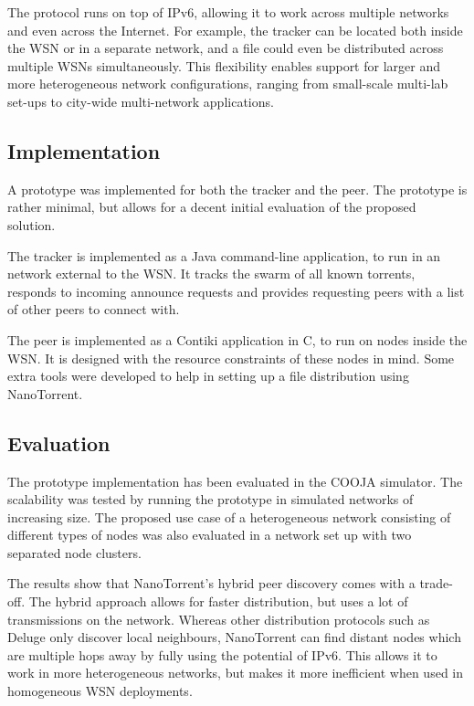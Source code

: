 The protocol runs on top of \gls{IPv6}, allowing it to work across multiple networks and even across the Internet. For example, the tracker can be located both inside the \gls{WSN} or in a separate network, and a file could even be distributed across multiple \glspl{WSN} simultaneously. This flexibility enables support for larger and more heterogeneous network configurations, ranging from small-scale multi-lab set-ups to city-wide multi-network applications.

\subsection{Implementation}
A prototype was implemented for both the tracker and the peer. The prototype is rather minimal, but allows for a decent initial evaluation of the proposed solution.

The tracker is implemented as a Java command-line application, to run in an network external to the \gls{WSN}. It tracks the swarm of all known torrents, responds to incoming announce requests and provides requesting peers with a list of other peers to connect with.

The peer is implemented as a Contiki application in C, to run on nodes inside the \gls{WSN}. It is designed with the resource constraints of these nodes in mind. Some extra tools were developed to help in setting up a file distribution using NanoTorrent.

\subsection{Evaluation}
The prototype implementation has been evaluated in the COOJA simulator. The scalability was tested by running the prototype in simulated networks of increasing size. The proposed use case of a heterogeneous network consisting of different types of nodes was also evaluated in a network set up with two separated node clusters.

The results show that NanoTorrent's hybrid peer discovery comes with a trade-off. The hybrid approach allows for faster distribution, but uses a lot of transmissions on the network. Whereas other distribution protocols such as Deluge \cite{deluge} only discover local neighbours, NanoTorrent can find distant nodes which are multiple hops away by fully using the potential of \gls{IPv6}. This allows it to work in more heterogeneous networks, but makes it more inefficient when used in homogeneous \gls{WSN} deployments.

